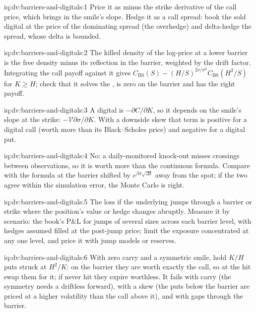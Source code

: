 \begin{solution}{iq:dv:barriers-and-digitals:1}
Price it as minus the strike derivative of the call price, which brings in the smile's slope. Hedge it as a call spread:
book the sold digital at the price of the dominating spread (the overhedge) and delta-hedge the spread, whose delta is
bounded.
\end{solution}

\begin{solution}{iq:dv:barriers-and-digitals:2}
The killed density of the log-price at a lower barrier is the free density minus its reflection in the barrier, weighted
by the drift factor. Integrating the call payoff against it gives
$C_{\mathrm{BS}}(S)-(H/S)^{2\nu/\sigma^2}C_{\mathrm{BS}}(H^2/S)$ for $K\ge H$; check that it solves the , is zero
on the barrier and has the right payoff.
\end{solution}

\begin{solution}{iq:dv:barriers-and-digitals:3}
A digital is $-\partial C/\partial K$, so it depends on the smile's slope at the strike: $-\mathcal V\partial\sigma/\partial K$.
With a downside skew that term is positive for a digital call (worth more than its Black--Scholes price) and negative for a
digital put.
\end{solution}

\begin{solution}{iq:dv:barriers-and-digitals:4}
No: a daily-monitored knock-out misses crossings between observations, so it is worth more than the continuous formula. Compare
with the formula at the barrier shifted by $e^{\beta\sigma\sqrt{\Delta t}}$ away from the spot; if the two agree within the
simulation error, the Monte Carlo is right.
\end{solution}

\begin{solution}{iq:dv:barriers-and-digitals:5}
The loss if the underlying jumps through a barrier or strike where the position's value or hedge changes abruptly. Measure it
by scenario: the book's P\&L for jumps of several sizes across each barrier level, with hedges assumed filled at the post-jump
price; limit the exposure concentrated at any one level, and price it with jump models or reserves.
\end{solution}

\begin{solution}{iq:dv:barriers-and-digitals:6}
With zero carry and a symmetric smile, hold $K/H$ puts struck at $H^2/K$: on the barrier they are worth exactly the call, so
at the hit swap them for it; if never hit they expire worthless. It fails with carry (the symmetry needs a driftless forward),
with a skew (the puts below the barrier are priced at a higher volatility than the call above it), and with gaps through the
barrier.
\end{solution}
